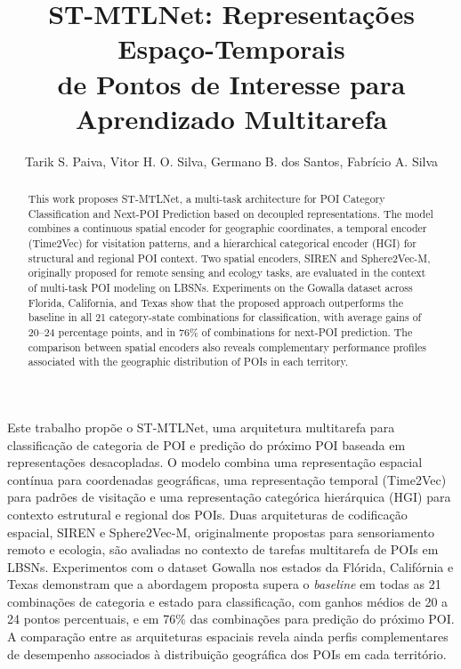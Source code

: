 \documentclass[12pt]{article}
\title{ST-MTLNet: Representações Espaço-Temporais \\de Pontos de Interesse para Aprendizado Multitarefa}
\author{ Tarik S. Paiva\inst{1}, Vitor H. O. Silva\inst{1}, Germano B. dos Santos\inst{1}, Fabrício A. Silva\inst{1}}
\begin{document}
 

\maketitle

\begin{abstract}
This work proposes ST-MTLNet, a multi-task architecture for POI Category Classification and Next-POI Prediction based on decoupled representations. The model combines a continuous spatial encoder for geographic coordinates, a temporal encoder (Time2Vec) for visitation patterns, and a hierarchical categorical encoder (HGI) for structural and regional POI context. Two spatial encoders, SIREN and Sphere2Vec-M, originally proposed for remote sensing and ecology tasks, are evaluated in the context of multi-task POI modeling on LBSNs. Experiments on the Gowalla dataset across Florida, California, and Texas show that the proposed approach outperforms the baseline in all 21 category-state combinations for classification, with average gains of 20--24 percentage points, and in 76\% of combinations for next-POI prediction. The comparison between spatial encoders also reveals complementary performance profiles associated with the geographic distribution of POIs in each territory.
\end{abstract}

\begin{resumo}
Este trabalho propõe o ST-MTLNet, uma arquitetura multitarefa para classificação de categoria de POI e predição do próximo POI baseada em representações desacopladas. O modelo combina uma representação espacial contínua para coordenadas geográficas, uma representação temporal (Time2Vec) para padrões de visitação e uma representação categórica hierárquica (HGI) para contexto estrutural e regional dos POIs. Duas arquiteturas de codificação espacial, SIREN e Sphere2Vec-M, originalmente propostas para sensoriamento remoto e ecologia, são avaliadas no contexto de tarefas multitarefa de POIs em LBSNs. Experimentos com o dataset Gowalla nos estados da Flórida, Califórnia e Texas demonstram que a abordagem proposta supera o \textit{baseline} em todas as 21 combinações de categoria e estado para classificação, com ganhos médios de 20 a 24 pontos percentuais, e em 76\% das combinações para predição do próximo POI. A comparação entre as arquiteturas espaciais revela ainda perfis complementares de desempenho associados à distribuição geográfica dos POIs em cada território.
\end{resumo}
\end{document}
